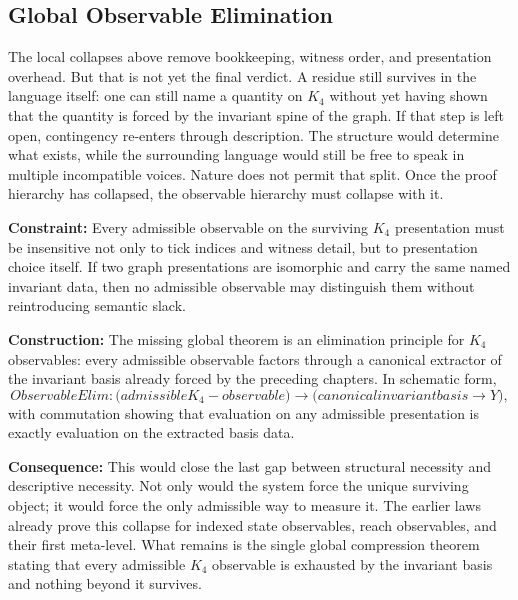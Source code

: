 \documentclass[11pt,a4paper]{book}
\def\mathrm#1{#1}%
\def\text#1{#1}%
\begin{document}
\subsection{Global Observable Elimination}

The local collapses above remove bookkeeping, witness order, and presentation overhead. But that is not yet the final verdict. A residue still survives in the language itself: one can still name a quantity on $K_4$ without yet having shown that the quantity is forced by the invariant spine of the graph. If that step is left open, contingency re-enters through description. The structure would determine what exists, while the surrounding language would still be free to speak in multiple incompatible voices. Nature does not permit that split. Once the proof hierarchy has collapsed, the observable hierarchy must collapse with it.

\textbf{Constraint:} Every admissible observable on the surviving $K_4$ presentation must be insensitive not only to tick indices and witness detail, but to presentation choice itself. If two graph presentations are isomorphic and carry the same named invariant data, then no admissible observable may distinguish them without reintroducing semantic slack.

\textbf{Construction:} The missing global theorem is an elimination principle for $K_4$ observables: every admissible observable factors through a canonical extractor of the invariant basis already forced by the preceding chapters. In schematic form,
$$
\mathrm{ObservableElim} :
\bigl(\text{admissible }K_4\text{-observable}\bigr)
\to
\bigl(\text{canonical invariant basis} \to Y\bigr),
$$
with commutation showing that evaluation on any admissible presentation is exactly evaluation on the extracted basis data.

\textbf{Consequence:} This would close the last gap between structural necessity and descriptive necessity. Not only would the system force the unique surviving object; it would force the only admissible way to measure it. The earlier laws already prove this collapse for indexed state observables, reach observables, and their first meta-level. What remains is the single global compression theorem stating that every admissible $K_4$ observable is exhausted by the invariant basis and nothing beyond it survives.
\end{document}
